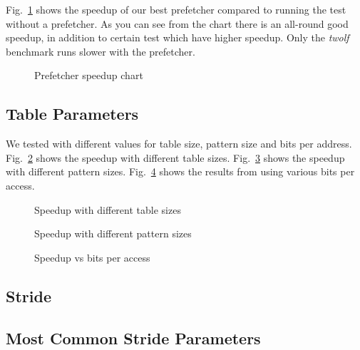 Fig.~\ref{fig:prefetcher_speedup} shows the speedup of our best prefetcher
compared to running the test without a prefetcher. As you can see from the
chart there is an all-round good speedup, in addition to certain test which
have higher speedup. Only the \emph{twolf} benchmark runs slower with the
prefetcher.

\begin{figure}
	
	\caption{Prefetcher speedup chart}
	\label{fig:prefetcher_speedup}
\end{figure}

\subsection{Table Parameters}
We tested with different values for table size, pattern size and bits per address.
Fig.~\ref{fig:table_size_chart} shows the speedup with different table sizes.
Fig.~\ref{fig:pattern_size} shows the speedup with different pattern sizes.
Fig.~\ref{fig:bits} shows the results from using various bits per access.

\begin{figure}
	
	\caption{Speedup with different table sizes}
	\label{fig:table_size_chart}
\end{figure}

\begin{figure}
	
	\caption{Speedup with different pattern sizes}
	\label{fig:pattern_size}
\end{figure}

\begin{figure}
	
	\caption{Speedup vs bits per access}
	\label{fig:bits}
\end{figure}

\subsection{Stride}

\subsection{Most Common Stride Parameters}


